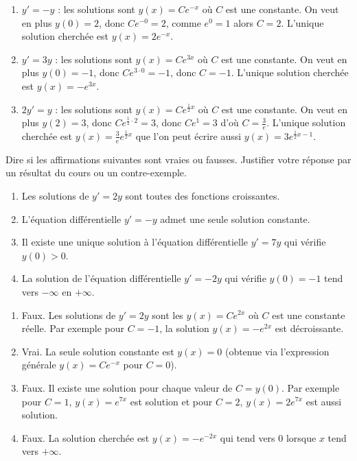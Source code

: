 \documentclass[11pt,class=report,crop=false]{standalone}
\begin{document}
\correction
\sauteligne
\begin{enumerate}
  \item $y'=-y$ : les solutions sont $y(x)=Ce^{-x}$ où $C$ est une constante.
  On veut en plus $y(0)=2$, donc $Ce^{-0}=2$, comme $e^0=1$ alors $C=2$. L'unique solution cherchée est $y(x)=2e^{-x}$.

  \item $y'=3y$ : les solutions sont $y(x)=Ce^{3x}$ où $C$ est une constante.
  On veut en plus $y(0)=-1$, donc $Ce^{3\cdot 0}=-1$, donc $C=-1$. L'unique solution cherchée est $y(x)=-e^{3x}$.

  \item $2y'=y$ : les solutions sont $y(x)=Ce^{\frac12x}$ où $C$ est une constante.
  On veut en plus $y(2)=3$, donc $Ce^{\frac12 \cdot 2}=3$, donc $C e^1=3$ d'où $C = \frac{3}{e}$. L'unique solution cherchée est $y(x)=\frac{3}{e}e^{\frac12x}$ que l'on peut écrire aussi $y(x)=3e^{\frac12x-1}$.
\end{enumerate}
\fincorrection
\finexercice


\exercice{}
\enonce
Dire si les affirmations suivantes sont vraies ou fausses. Justifier votre réponse par un résultat du cours ou un contre-exemple.
 \begin{enumerate}
  \item \og{}Les solutions de $y'=2y$ sont toutes des fonctions croissantes.\fg{}
  \item \og{}L'équation différentielle $y'=-y$ admet une seule solution constante.\fg{}
  \item \og{}Il existe une unique solution à l'équation différentielle $y'=7y$ qui vérifie $y(0)>0$.\fg{}
  \item \og{}La solution de l'équation différentielle $y'=-2y$ qui vérifie $y(0)=-1$ tend vers $-\infty$ en $+\infty$.\fg{}
\end{enumerate} 
\finenonce

\noindication

\correction
\sauteligne
 \begin{enumerate}
  \item Faux. Les solutions de $y'=2y$ sont les $y(x)=Ce^{2x}$ où $C$ est une constante réelle. Par exemple pour $C=-1$, la solution $y(x)=-e^{2x}$ est décroissante.
  \item Vrai. La seule solution constante est $y(x)=0$ (obtenue via l'expression générale $y(x) = C e^{-x}$ pour $C=0$).
  \item Faux. Il existe une solution pour chaque valeur de $C=y(0)$. Par exemple pour $C=1$, $y(x)=e^{7x}$ est solution et pour $C=2$, $y(x)=2e^{7x}$ est aussi solution.
  \item Faux. La solution cherchée est $y(x)=-e^{-2x}$ qui tend vers $0$ lorsque $x$ tend vers $+\infty$.
\end{enumerate} 
\fincorrection
\finexercice
\end{document}

